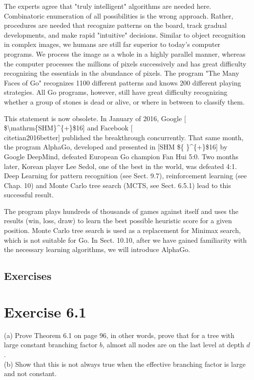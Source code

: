 \documentclass[10pt]{book}
\begin{document}
\begin{displayquote}
The experts agree that "truly intelligent" algorithms are needed here. Combinatoric enumeration of all possibilities is the wrong approach. Rather, procedures are needed that recognize patterns on the board, track gradual developments, and make rapid "intuitive" decisions. Similar to object recognition in complex images, we humans are still far superior to today's computer programs. We process the image as a whole in a highly parallel manner, whereas the computer processes the millions of pixels successively and has great difficulty recognizing the essentials in the abundance of pixels. The program "The Many Faces of Go" recognizes 1100 different patterns and knows 200 different playing strategies. All Go programs, however, still have great difficulty recognizing whether a group of stones is dead or alive, or where in between to classify them.
\end{displayquote}

This statement is now obsolete. In January of 2016, Google [ \$\textbackslash mathrm\{SHM\}\^{}\{+\}\$16] and Facebook [\\cite{tian2016better}] published the breakthrough concurrently. That same month, the program AlphaGo, developed and presented in [SHM \$\{ \}\^{}\{+\}\$16] by Google DeepMind, defeated European Go champion Fan Hui 5:0. Two months later, Korean player Lee Sedol, one of the best in the world, was defeated 4:1. Deep Learning for pattern recognition (see Sect. 9.7), reinforcement learning (see Chap. 10) and Monte Carlo tree search (MCTS, see Sect. 6.5.1) lead to this successful result.

The program plays hundreds of thousands of games against itself and uses the results (win, loss, draw) to learn the best possible heuristic score for a given position. Monte Carlo tree search is used as a replacement for Minimax search, which is not suitable for Go. In Sect. 10.10, after we have gained familiarity with the necessary learning algorithms, we will introduce AlphaGo.


\subsection*{Exercises}
\section*{Exercise 6.1}
(a) Prove Theorem 6.1 on page 96, in other words, prove that for a tree with large constant branching factor $b$, almost all nodes are on the last level at depth $d$.\\
(b) Show that this is not always true when the effective branching factor is large and not constant.
\end{document}
